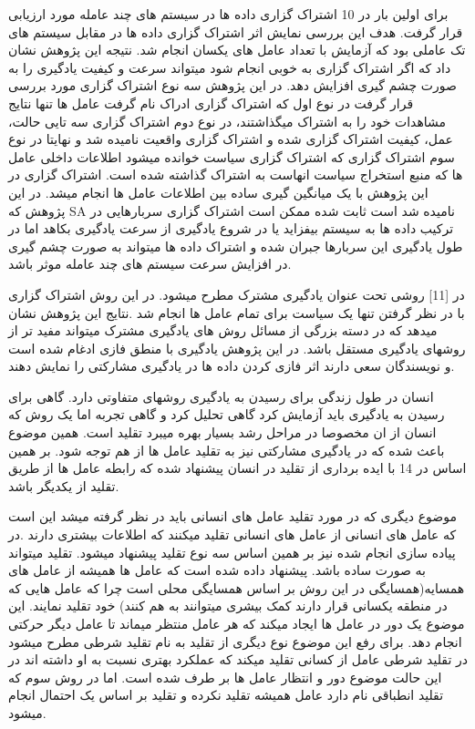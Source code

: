 برای اولین بار در 10 اشتراک گزاری داده ها در سیستم های چند عامله مورد ارزیابی قرار گرفت. هدف این بررسی نمایش اثر اشتراک گزاری داده ها در مقابل سیستم های تک عاملی بود که آزمایش با تعداد عامل های یکسان انجام شد. نتیجه این پژوهش نشان داد که اگر اشتراک گزاری به خوبی انجام شود میتواند سرعت و کیفیت یادگیری را به صورت چشم گیری افزایش دهد. در این پژوهش سه نوع اشتراک گزاری مورد بررسی قرار گرفت در نوع اول که اشتراک گزاری ادراک نام گرفت عامل ها تنها نتایج مشاهدات خود را به اشتراک میگذاشتند، در نوع دوم اشتراک گزاری سه تایی حالت، عمل، کیفیت اشتراک گزاری شده و اشتراک گزاری واقعیت نامیده شد و نهایتا در نوع سوم اشتراک گزاری که اشتراک گزاری سیاست خوانده میشود اطلاعات داخلی عامل ها که منبع استخراج سیاست انهاست به اشتراک گذاشته شده است. اشتراک گزاری در این پژوهش با یک میانگین گیری ساده بین اطلاعات عامل ها انجام میشد. در این پژوهش که SA نامیده شد است ثابت شده ممکن است اشتراک گزاری سربارهایی در ترکیب داده ها به سیستم بیفزاید یا در شروع یادگیری از سرعت یادگیری بکاهد اما در طول یادگیری این سربارها جبران شده و اشتراک داده ها میتواند به صورت چشم گیری در افزایش سرعت سیستم های چند عامله موثر باشد.

در [11] روشی تحت عنوان یادگیری مشترک مطرح میشود. در این روش اشتراک گزاری با در نظر گرفتن تنها یک سیاست برای تمام عامل ها انجام شد .نتایج این پژوهش نشان میدهد که در دسته بزرگی از مسائل روش های یادگیری مشترک میتواند مفید تر از روشهای یادگیری مستقل باشد. در این پژوهش یادگیری با منطق فازی ادغام شده است و نویسندگان سعی دارند اثر فازی کردن داده ها در یادگیری مشارکتی را نمایش دهند.

انسان در طول زندگی برای رسیدن به یادگیری روشهای متفاوتی دارد. گاهی برای رسیدن به یادگیری باید آزمایش کرد گاهی تحلیل کرد و گاهی تجربه اما یک روش که انسان از ان مخصوصا در مراحل رشد بسیار بهره میبرد تقلید است. همین موضوع باعث شده که در یادگیری مشارکتی نیز به تقلید عامل ها از هم توجه شود. بر همین اساس در 14 با ایده برداری از تقلید در انسان پیشنهاد شده که رابطه عامل ها از طریق تقلید از یکدیگر باشد.

موضوع دیگری که در مورد تقلید عامل های انسانی باید در نظر گرفته میشد این است که عامل های انسانی از عامل های انسانی تقلید میکنند که اطلاعات بیشتری دارند .در پیاده سازی انجام شده نیز بر همین اساس سه نوع تقلید پیشنهاد میشود. تقلید میتواند به صورت ساده باشد. پیشنهاد داده شده است که عامل ها همیشه از عامل های همسایه(همسایگی در این روش بر اساس همسایگی محلی است چرا که عامل هایی که در منطقه یکسانی قرار دارند کمک بیشری میتوانند به هم کنند) خود تقلید نمایند. این موضوع یک دور در عامل ها ایجاد میکند که هر عامل منتظر میماند تا عامل دیگر حرکتی انجام دهد. برای رفع این موضوع نوع دیگری از تقلید به نام تقلید شرطی مطرح میشود در تقلید شرطی عامل از کسانی تقلید میکند که عملکرد بهتری نسبت به او داشته اند در این حالت موضوع دور و انتظار عامل ها بر طرف شده است. اما در روش سوم که تقلید انطباقی نام دارد عامل همیشه تقلید نکرده و تقلید بر  اساس یک احتمال انجام میشود.

